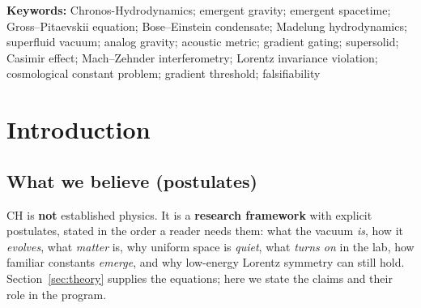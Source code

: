 \documentclass[11pt,a4paper]{article}
\begin{document}
\noindent\textbf{Keywords:} Chronos-Hydrodynamics; emergent gravity; emergent spacetime; Gross--Pitaevskii equation; Bose--Einstein condensate; Madelung hydrodynamics; superfluid vacuum; analog gravity; acoustic metric; gradient gating; supersolid; Casimir effect; Mach--Zehnder interferometry; Lorentz invariance violation; cosmological constant problem; gradient threshold; falsifiability

\section{Introduction}
\label{sec:intro}

\subsection{What we believe (postulates)}

CH is \textbf{not} established physics.
It is a \textbf{research framework} with explicit postulates, stated in the order a reader needs them: what the vacuum \emph{is}, how it \emph{evolves}, what \emph{matter} is, why uniform space is \emph{quiet}, what \emph{turns on} in the lab, how familiar constants \emph{emerge}, and why low-energy Lorentz symmetry can still hold.
Section~\ref{sec:theory} supplies the equations; here we state the claims and their role in the program.
\end{document}
